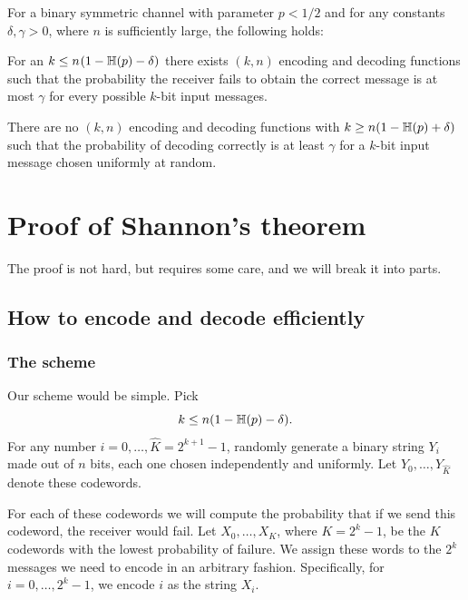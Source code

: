 \begin{theorem}
    For a binary symmetric channel with parameter $p < 1/2$ and for
    any constants $\delta, \gamma > 0$, where $n$ is sufficiently
    large, the following holds:
    \begin{compactenumi}
        \item For an $k \leq n\ts(1-\Entropy{p} - \delta)$ there
        exists $(k,n)$ encoding and decoding functions such that the
        probability the receiver fails to obtain the correct message
        is at most $\gamma$ for every possible $k$-bit input messages.

        \item There are no $(k,n)$ encoding and decoding functions
        with $k \geq n (1-\Entropy{p}+\delta)$ such that the
        probability of decoding correctly is at least $\gamma$ for a
        $k$-bit input message chosen uniformly at random.
    \end{compactenumi}
\end{theorem}

\section{Proof of Shannon's theorem}

The proof is not hard, but requires some care, and we will break it
into parts.

\subsection{How to encode and decode efficiently}

\subsubsection{The scheme}

Our scheme would be simple. Pick
\begin{equation*}
    k \leq n(1-\Entropy{p} - \delta).
\end{equation*}
For any number $i= 0, \ldots, \widehat{K} = 2^{k+1}-1$,
randomly generate a binary string $Y_i$ made out of $n$ bits, each one
chosen independently and uniformly. Let $Y_0, \ldots, Y_{
   \widehat{K}}$ denote these codewords.

For each of these codewords we will compute the probability that if we
send this codeword, the receiver would fail. Let $X_0, \ldots, X_{K}$,
where $K = 2^k-1$, be the $K$ codewords with the lowest probability of
failure. We assign these words to the $2^k$ messages we need to encode
in an arbitrary fashion. Specifically, for $i=0,\ldots, 2^k-1$, we
encode $i$ as the string $X_i$.

